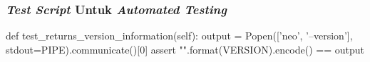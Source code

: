 \subsubsection{\emph{Test Script} Untuk \emph{Automated Testing}}

\begin{code}
\begin{ignasicblock}[title=test\_returns\_version\_information,minted language=Python]
def test_returns_version_information(self):
    output = Popen(['neo', '--version'], stdout=PIPE).communicate()[0]
    assert "{}\n".format(VERSION).encode() == output
\end{ignasicblock}
\label{ts:show-version}
\end{code}

